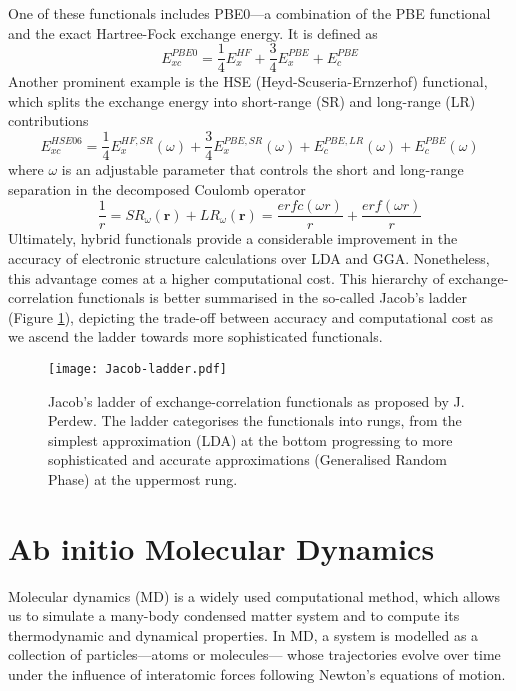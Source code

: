 One of these functionals includes PBE0\supercite{Heyd2003}---a combination of the PBE functional and the exact Hartree-Fock exchange energy. It is defined as 
\begin{equation}
  \label{eq66}
  E_{xc}^{PBE0} = \frac{1}{4}E_{x}^{HF} + \frac{3}{4}E_{x}^{PBE} + E_{c}^{PBE}
\end{equation}
Another prominent example is the HSE (Heyd-Scuseria-Ernzerhof) functional\supercite{Moussa2012}, which splits the exchange energy into short-range (SR) and long-range (LR) contributions
\begin{equation}
  \label{eq67}
  E_{xc}^{HSE06} = \frac{1}{4}E_{x}^{HF,SR}(\omega) + \frac{3}{4}E_{x}^{PBE,SR}(\omega) + E_{c}^{PBE,LR}(\omega) + E_{c}^{PBE}(\omega)
  \end{equation}
  where $\omega$ is an adjustable parameter that controls the short and long-range separation in the decomposed Coulomb operator
  \begin{equation}
    \label{eq68}
    \frac{1}{r} = SR_{\omega}(\mathbf{r}) + LR_{\omega}(\mathbf{r}) = 
    \frac{erfc(\omega r)}{r} + \frac{erf(\omega r)}{r}
  \end{equation}
Ultimately, hybrid functionals provide a considerable improvement in the accuracy of electronic structure calculations over LDA and GGA. Nonetheless, this advantage comes at a higher computational cost. This hierarchy of exchange-correlation functionals is better summarised in the so-called Jacob's ladder\supercite{Perdew2001} (Figure \ref{fig:jacob-ladder}), depicting the trade-off between accuracy and computational cost as we ascend the ladder towards more sophisticated functionals. 
\begin{figure}[H]
  \centering
  \texttt{[image: Jacob-ladder.pdf]}
  \caption{Jacob's ladder of exchange-correlation functionals as proposed by J. Perdew\supercite{Perdew2001}. The ladder categorises the functionals into rungs, from the simplest approximation (LDA) at the bottom progressing to more sophisticated and accurate approximations (Generalised Random Phase) at the uppermost rung.  
  }
  \label{fig:jacob-ladder}
\end{figure}


\section{Ab initio Molecular Dynamics} 
Molecular dynamics (MD)\supercite{marx2009ab, Kuhne2014} is a widely used computational method, which allows us to simulate a many-body condensed matter system and to compute its thermodynamic and dynamical properties. In MD, a system is modelled as a collection of particles---atoms or molecules--- whose trajectories evolve over time under the influence of interatomic forces following Newton's equations of motion. 


